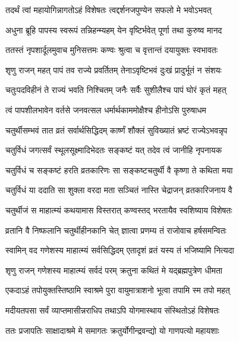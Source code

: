 \twolineshloka
{तदर्थं त्वां महायोगिन्नागतोऽहं विशेषतः}
{त्वद्दर्शनजपुण्येन सफलो मे भवोऽभवत्} %

\twolineshloka
{अधुना ब्रूहि पापस्य स्वरूपं तन्निहन्म्यहम्}
{येन वृष्टिर्भवेत् पूर्णा तथा कुरुष्व मानद} %

\twolineshloka
{ततस्तं नृपशार्दूलमुवाच मुनिसत्तमः}
{कण्वः श्रुत्वा च वृत्तान्तं दयायुक्तः स्वभावतः} %


\twolineshloka
{श‍ृणु राजन् महत् पापं तव राज्ये प्रवर्तितम्}
{तेनाऽवृष्टिभवं दुःखं प्रादुर्भूतं न संशयः} %

\twolineshloka
{चतुःपदविहीनं ते राज्यं भवति निश्चितम्}
{जनैः सर्वैः सुशीलैश्च पापं घोरं कृतं महत्} %

\twolineshloka
{त्वं पापशीलभावेन वर्तसे जनवत्सल}
{धर्मार्थकाममोक्षैश्च हीनोऽसि पुरुषाधम} %

\twolineshloka
{चतुर्थीसम्भवं तात व्रतं सर्वार्थसिद्धिदम्}
{कार्ष्णं शौक्लं सुविख्यातं भ्रष्टं राज्येऽभवन्नृप} %

\twolineshloka
{चतुर्विधं जगत्सर्वं स्थूलसूक्ष्मादिभेदतः}
{सङ्कष्टं यत् तदेव त्वं जानीहि नृपनायक} %

\twolineshloka
{चतुर्विधं च सङ्कष्टं हरति व्रतकारिणः}
{सा सङ्कष्टचतुर्थी वै कृष्णा ते कथिता मया} %

\twolineshloka
{चतुर्विधं या ददाति सा शुक्ला वरदा मता}
{सञ्चितं नास्ति चेद्राजन् व्रतकारिजनाय वै} %

\twolineshloka
{चतुर्थीजं स माहात्म्यं कथयामास विस्तरात्}
{कण्वस्तद् भरतायैव स्वशिष्याय विशेषतः} %

\twolineshloka
{व्रतानि वै निष्फलानि चतुर्थीहीनकानि चेत्}
{ज्ञात्वा प्रणम्य तं राजोवाच हर्षसमन्वितः} %


\twolineshloka
{स्वामिन् वद गणेशस्य माहात्म्यं सर्वसिद्धिदम्}
{एतादृशं व्रतं यस्य तं भजिष्यामि नित्यदा} %


\twolineshloka
{श‍ृणु राजन् गणेशस्य माहात्म्यं सर्वदं परम्}
{क्रतुना कथितं मे यद्ब्रह्मपुत्रेण धीमता} %

\twolineshloka
{एकदाऽहं तपोयुक्तस्तिष्ठामि स्वाश्रमे पुरा}
{वायुमात्राशनो भूत्वा तपामि स्म तपो महत्} %

\twolineshloka
{मदीयतपसा सर्वं व्याप्तमासीन्नराधिप}
{तथाऽपि योगमास्थाय संस्थितोऽहं विशेषतः} %

\twolineshloka
{ततः प्रजापतिः साक्षादाश्रमे मे समागतः}
{क्रतुर्योगीन्द्रवन्द्यो यो गाणपत्यो महायशाः} %

